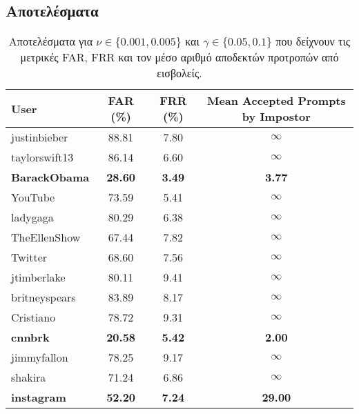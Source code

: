 \subsection{Αποτελέσματα}
\begin{table}[H]
\centering
\begin{tabular}{|l|c|c|c|}
\hline
\textbf{User} & \textbf{FAR (\%)} & \textbf{FRR (\%)} & \textbf{Mean Accepted Prompts by Impostor} \\ \hline
justinbieber & 88.81 & 7.80 & $\infty$ \\ \hline
taylorswift13 & 86.14 & 6.60 & $\infty$ \\ \hline
\textbf{BarackObama} & \textbf{28.60} & \textbf{3.49} & \textbf{3.77} \\ \hline
YouTube & 73.59 & 5.41 & $\infty$ \\ \hline
ladygaga & 80.29 & 6.38 & $\infty$ \\ \hline
TheEllenShow & 67.44 & 7.82 & $\infty$ \\ \hline
Twitter & 68.60 & 7.56 & $\infty$ \\ \hline
jtimberlake & 80.11 & 9.41 & $\infty$ \\ \hline
britneyspears & 83.89 & 8.17 & $\infty$ \\ \hline
Cristiano & 78.72 & 9.31 & $\infty$ \\ \hline
\textbf{cnnbrk} & \textbf{20.58} & \textbf{5.42} & \textbf{2.00} \\ \hline
jimmyfallon & 78.25 & 9.17 & $\infty$ \\ \hline
shakira & 71.24 & 6.86 & $\infty$ \\ \hline
\textbf{instagram} & \textbf{52.20} & \textbf{7.24} & \textbf{29.00} \\ \hline
\end{tabular}
\caption{Αποτελέσματα για $\nu \in \{0.001, 0.005\}$ και $\gamma \in \{0.05, 0.1\}$ που δείχνουν τις μετρικές FAR, FRR και τον μέσο αριθμό αποδεκτών προτροπών από εισβολείς.}
\label{tab:results_weighted_voting}
\end{table}


